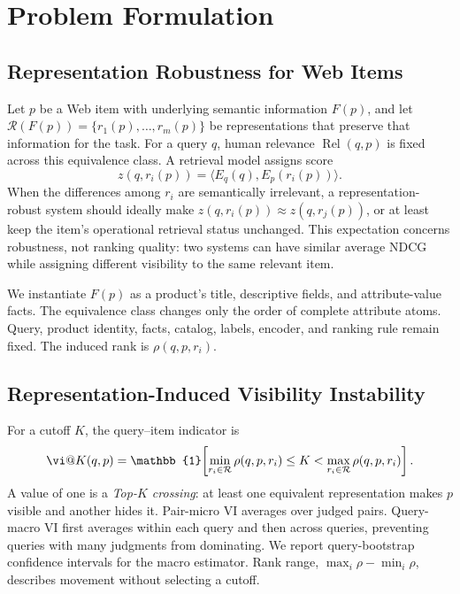 \section{Problem Formulation}

\subsection{Representation Robustness for Web Items}

Let $p$ be a Web item with underlying semantic information $F(p)$, and let
$\mathcal{R}(F(p))=\{r_1(p),\ldots,r_m(p)\}$ be representations that preserve that information for the task. For a query $q$, human relevance $\operatorname{Rel}(q,p)$ is fixed across this equivalence class. A retrieval model assigns score
\begin{equation}
 z(q,r_i(p))=\langle E_q(q),E_p(r_i(p))\rangle.
\end{equation}
When the differences among $r_i$ are semantically irrelevant, a representation-robust system should ideally make $z(q,r_i(p))\approx z(q,r_j(p))$, or at least keep the item's operational retrieval status unchanged. This expectation concerns robustness, not ranking quality: two systems can have similar average NDCG while assigning different visibility to the same relevant item.

We instantiate $F(p)$ as a product's title, descriptive fields, and attribute-value facts. The equivalence class changes only the order of complete attribute atoms. Query, product identity, facts, catalog, labels, encoder, and ranking rule remain fixed. The induced rank is $\rho(q,p,r_i)$.

\subsection{Representation-Induced Visibility Instability}

For a cutoff $K$, the query--item indicator is
\begin{equation}
\vi@K(q,p)=\mathbb{1}\!\left[
\min_{r_i\in\mathcal{R}}\rho(q,p,r_i)\leq K <
\max_{r_i\in\mathcal{R}}\rho(q,p,r_i)
\right].
\end{equation}
A value of one is a \emph{Top-$K$ crossing}: at least one equivalent representation makes $p$ visible and another hides it. Pair-micro VI averages over judged pairs. Query-macro VI first averages within each query and then across queries, preventing queries with many judgments from dominating. We report query-bootstrap confidence intervals for the macro estimator. Rank range, $\max_i\rho-\min_i\rho$, describes movement without selecting a cutoff.

